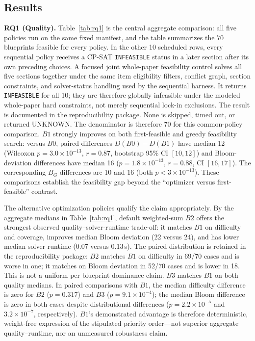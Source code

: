 \documentclass[runningheads]{llncs}
\begin{document}
\subsection{Results}
\noindent\textbf{RQ1 (Quality).} Table~\ref{tab:rq1} is the central aggregate comparison: all five policies run on the same fixed manifest, and the table summarizes the 70 blueprints feasible for every policy.
In the other 10 scheduled rows, every sequential policy receives a CP-SAT \texttt{INFEASIBLE} status in a later section after its own preceding choices.
A focused joint whole-paper feasibility control solves all five sections together under the same item eligibility filters, conflict graph, section constraints, and solver-status handling used by the sequential harness. It returns \texttt{INFEASIBLE} for all 10; they are therefore globally infeasible under the modeled whole-paper hard constraints, not merely sequential lock-in exclusions. The result is documented in the reproducibility package.
None is skipped, timed out, or returned UNKNOWN. The denominator is therefore 70 for this common-policy comparison.
$B1$ strongly improves on both first-feasible and greedy feasibility search: versus $B0$, paired differences $D(B0)-D(B1)$ have median 12 (Wilcoxon $p=3.0{\times}10^{-13}$, $r=0.87$, bootstrap 95\% CI $[10,12]$) and Bloom-deviation differences have median 16 ($p=1.8{\times}10^{-13}$, $r=0.88$, CI $[16,17]$).
The corresponding $B_G$ differences are 10 and 16 (both $p<3{\times}10^{-13}$).
These comparisons establish the feasibility gap beyond the ``optimizer versus first-feasible'' contrast.

The alternative optimization policies qualify the claim appropriately.
By the aggregate medians in Table~\ref{tab:rq1}, default weighted-sum $B2$ offers the strongest observed quality--solver-runtime trade-off: it matches $B1$ on difficulty and coverage, improves median Bloom deviation (22 versus 24), and has lower median solver runtime (0.07 versus 0.13\,s).
The paired distribution is retained in the reproducibility package: $B2$ matches $B1$ on difficulty in 69/70 cases and is worse in one;
it matches on Bloom deviation in 52/70 cases and is lower in 18. This is not a uniform per-blueprint dominance claim.
$B3$ matches $B1$ on both quality medians. In paired comparisons with $B1$, the median difficulty difference is zero for $B2$ ($p=0.317$) and $B3$ ($p=9.1{\times}10^{-4}$);
the median Bloom difference is zero in both cases despite distributional differences ($p=2.2{\times}10^{-5}$ and $3.2{\times}10^{-7}$, respectively).
$B1$'s demonstrated advantage is therefore deterministic, weight-free expression of the stipulated priority order---not superior aggregate quality--runtime, nor an unmeasured robustness claim.
\end{document}
